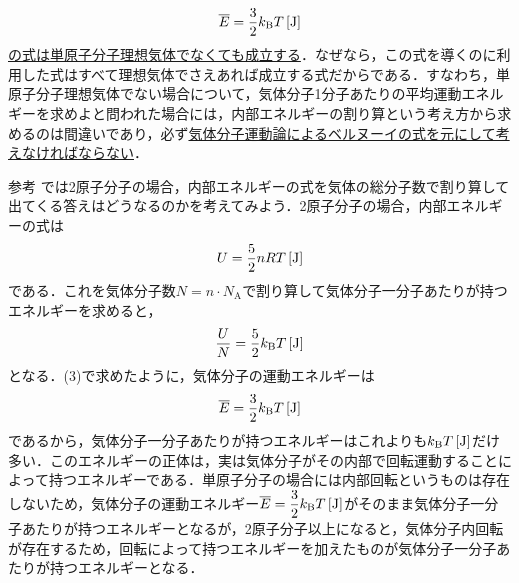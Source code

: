 \begin{multicols}{2}
\begin{chuu}
\[\overline{E}=\frac{3}{2}k_{\mathrm{B}}T\,[\mathrm{J}]\]
\underline{の式は}\hskip0pt\underline{単原子}\hskip0pt\underline{分子理}\hskip0pt\underline{想気体}\hskip0pt\underline{でなく}\hskip0pt\underline{ても成}\hskip0pt\underline{立する}．なぜなら，この式を導くのに利用した式はすべて理想気体でさえあれば成立する式だからである．すなわち，単原子分子理想気体でない場合について，気体分子1分子あたりの平均運動エネルギーを求めよと問われた場合には，内部エネルギーの割り算という考え方から求めるのは間違いであり，必ず\underline{気体分}\hskip0pt\underline{子運動}\hskip0pt\underline{論によ}\hskip0pt\underline{るベル}\hskip0pt\underline{ヌーイ}\hskip0pt\underline{の式を}\hskip0pt\underline{元にし}\hskip0pt\underline{て考え}\hskip0pt\underline{なけれ}\hskip0pt\underline{ばなら}\hskip0pt\underline{ない}．
\end{chuu}
\begin{bsHosoku}{参考}
では2原子分子の場合，内部エネルギーの式を気体の総分子数で割り算して出てくる答えはどうなるのかを考えてみよう．2原子分子の場合，内部エネルギーの式は
\[U=\frac{5}{2}nRT\,[\mathrm{J}]\]
である．これを気体分子数$N=n\cdot N_{\mathrm{A}}$で割り算して気体分子一分子あたりが持つエネルギーを求めると，
\[\frac{U}{N}=\frac{5}{2}k_{\mathrm{B}}T\,[\mathrm{J}]\]
となる．(3)で求めたように，気体分子の運動エネルギーは
\[\overline{E}=\frac{3}{2}k_{\mathrm{B}}T\,[\mathrm{J}]\]
であるから，気体分子一分子あたりが持つエネルギーはこれよりも$k_{\mathrm{B}}T\,[\mathrm{J}]$だけ多い．このエネルギーの正体は，実は気体分子がその内部で回転運動することによって持つエネルギーである．単原子分子の場合には内部回転というものは存在しないため，気体分子の運動エネルギー$\overline{E}=\dfrac{3}{2}k_{\mathrm{B}}T\,[\mathrm{J}]$がそのまま気体分子一分子あたりが持つエネルギーとなるが，2原子分子以上になると，気体分子内回転が存在するため，回転によって持つエネルギーを加えたものが気体分子一分子あたりが持つエネルギーとなる．
\end{bsHosoku}


\end{multicols}

